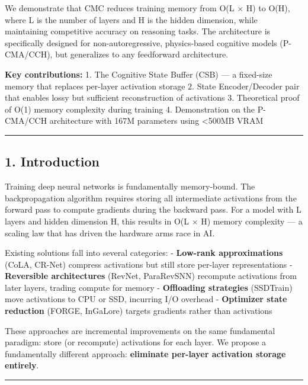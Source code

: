 \documentclass[
  11pt,
  a4paper,
]{article}
\begin{document}
We demonstrate that CMC reduces training memory from O(L × H) to O(H),
where L is the number of layers and H is the hidden dimension, while
maintaining competitive accuracy on reasoning tasks. The architecture is
specifically designed for non-autoregressive, physics-based cognitive
models (P-CMA/CCH), but generalizes to any feedforward architecture.

\textbf{Key contributions:} 1. The Cognitive State Buffer (CSB) --- a
fixed-size memory that replaces per-layer activation storage 2. State
Encoder/Decoder pair that enables lossy but sufficient reconstruction of
activations 3. Theoretical proof of O(1) memory complexity during
training 4. Demonstration on the P-CMA/CCH architecture with 167M
parameters using \textless500MB VRAM

\begin{center}\rule{0.5\linewidth}{0.5pt}\end{center}

\subsection{1. Introduction}\label{introduction}

Training deep neural networks is fundamentally memory-bound. The
backpropagation algorithm requires storing all intermediate activations
from the forward pass to compute gradients during the backward pass. For
a model with L layers and hidden dimension H, this results in O(L × H)
memory complexity --- a scaling law that has driven the hardware arms
race in AI.

Existing solutions fall into several categories: - \textbf{Low-rank
approximations} (CoLA, CR-Net) compress activations but still store
per-layer representations - \textbf{Reversible architectures} (RevNet,
ParaRevSNN) recompute activations from later layers, trading compute for
memory - \textbf{Offloading strategies} (SSDTrain) move activations to
CPU or SSD, incurring I/O overhead - \textbf{Optimizer state reduction}
(FORGE, InGaLore) targets gradients rather than activations

These approaches are incremental improvements on the same fundamental
paradigm: store (or recompute) activations for each layer. We propose a
fundamentally different approach: \textbf{eliminate per-layer activation
storage entirely}.

\begin{center}\rule{0.5\linewidth}{0.5pt}\end{center}
\end{document}
